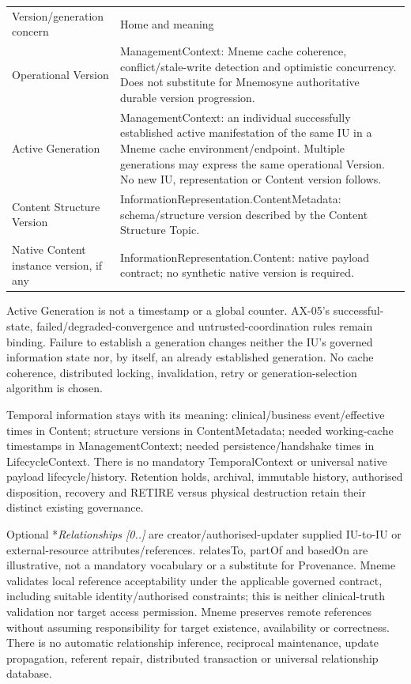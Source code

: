 \begin{longtable}{>{\raggedright\arraybackslash}p{}>{\raggedright\arraybackslash}p{}}
Version/generation concern & Home and meaning \\
Operational Version & ManagementContext: Mneme cache coherence, conflict/stale-write detection and optimistic concurrency. Does not substitute for Mnemosyne authoritative durable version progression. \\
Active Generation & ManagementContext: an individual successfully established active manifestation of the same IU in a Mneme cache environment/endpoint. Multiple generations may express the same operational Version. No new IU, representation or Content version follows. \\
Content Structure Version & InformationRepresentation.ContentMetadata: schema/structure version described by the Content Structure Topic. \\
Native Content instance version, if any & InformationRepresentation.Content: native payload contract; no synthetic native version is required. \\
\end{longtable}


Active Generation is not a timestamp or a global counter. AX-05's successful-state,
failed/degraded-convergence and untrusted-coordination rules remain binding.
Failure to establish a generation changes neither the IU's governed information
state nor, by itself, an already established generation. No cache coherence,
distributed locking, invalidation, retry or generation-selection algorithm is chosen.



Temporal information stays with its meaning: clinical/business event/effective
times in Content; structure versions in ContentMetadata; needed working-cache
timestamps in ManagementContext; needed persistence/handshake times in LifecycleContext.
There is no mandatory TemporalContext or universal native payload lifecycle/history.
Retention holds, archival, immutable history, authorised disposition, recovery and
RETIRE versus physical destruction retain their distinct existing governance.



Optional *\emph{Relationships [0..\emph{]}} are creator/authorised-updater supplied IU-to-IU
or external-resource attributes/references. relatesTo, partOf and basedOn are
illustrative, not a mandatory vocabulary or a substitute for Provenance. Mneme
validates local reference acceptability under the applicable governed contract,
including suitable identity/authorised constraints; this is neither clinical-truth
validation nor target access permission. Mneme preserves remote references without
assuming responsibility for target existence, availability or correctness. There
is no automatic relationship inference, reciprocal maintenance, update propagation,
referent repair, distributed transaction or universal relationship database.



